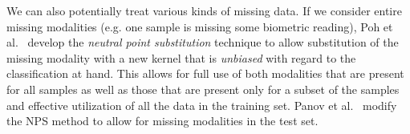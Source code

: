 We can also potentially treat various kinds of missing data.
If we consider entire missing modalities (e.g. one sample is
missing some biometric reading), Poh et al.\ \cite{poh2010addressing}
develop the \emph{neutral point substitution} technique to allow
substitution of the missing modality with a new kernel that is
\emph{unbiased} with regard to the classification at hand.  This
allows for full use of both modalities that are present for all
samples as well as those that are present only for a subset of the
samples and effective utilization of all the data in the training set.
Panov et al.\ \cite{panov2011modified} modify the NPS method to allow
for missing modalities in the test set.